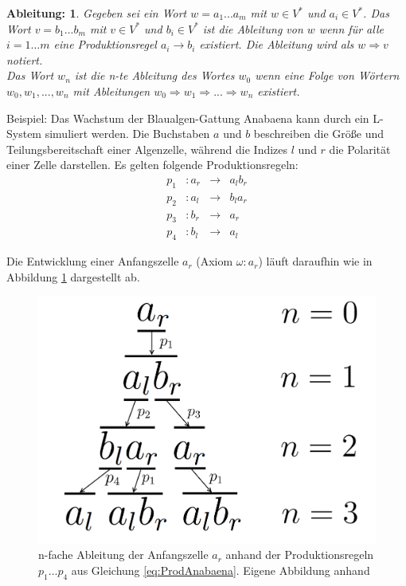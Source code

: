 \newtheorem{defAbleitung}{Ableitung:}[chapter]
\begin{defAbleitung}
	Gegeben sei ein Wort $w = a_1 ... a_m$ mit $w \in V^*$ und $a_i \in V^*$. Das Wort $v = b_1 ... b_m$ mit $v \in V^*$ und $b_i \in V^*$ ist die Ableitung von $w$ wenn für alle $i=1...m$ eine Produktionsregel $a_i \rightarrow b_i$ existiert. Die Ableitung wird als $w \Rightarrow v$ notiert. \\
	Das Wort $w_n$ ist die n-te Ableitung des Wortes $w_0$ wenn eine Folge von Wörtern $w_0, w_1, ..., w_n$ mit Ableitungen $w_0 \Rightarrow w_1 \Rightarrow ... \Rightarrow w_n$ existiert. \cite[S.4]{ABOP:04} 
\end{defAbleitung}


Beispiel: Das Wachstum der Blaualgen-Gattung \glqq Anabaena\grqq{} kann durch ein L-System simuliert werden. Die Buchstaben $a$ und $b$ beschreiben die Größe und Teilungsbereitschaft einer Algenzelle, während die Indizes $l$ und $r$ die Polarität einer Zelle darstellen. Es gelten folgende Produktionsregeln:
\begin{equation}
\begin{array}{cccc}
 p_1 & : a_r &\rightarrow& a_lb_r \\
p_2 &  : a_l &\rightarrow& b_la_r \\ 
p_3 &  : b_r &\rightarrow& a_r \\
p_4 &  : b_l &\rightarrow& a_l 
\end{array}
\label{eq:ProdAnabaena}
\end{equation} 

Die Entwicklung einer Anfangszelle $a_r$ (Axiom $\omega : a_r$) läuft daraufhin wie in Abbildung \ref{fig:AnabaenaAbleitung} dargestellt ab.
\begin{figure} [hbtp]
	\centering
	\includegraphics[height=0.3\textheight]{images/AnabaenaAbleitung.png}
	\caption{n-fache Ableitung der Anfangszelle $a_r$ anhand der Produktionsregeln $p_1 ... p_4$ aus Gleichung \ref{eq:ProdAnabaena}. Eigene Abbildung anhand \cite[S.4]{ABOP:04}}
	\label{fig:AnabaenaAbleitung}
\end{figure}

